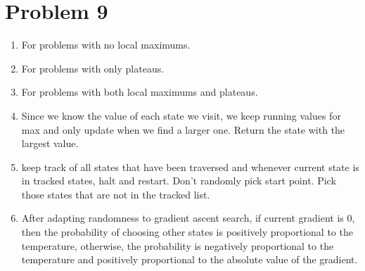 \documentclass{article}
\begin{document}
\section*{Problem 9}
\begin{enumerate}[label=(\alph*)]
    \item For problems with no local maximums.
    \item For problems with only plateaus.
    \item For problems with both local maximums and plateaus.
    \item Since we know the value of each state we visit, we keep running values for max and only update when we find a larger one. Return the state with the largest value.
    \item keep track of all states that have been traversed and whenever current state is in tracked states, halt and restart. Don't randomly pick start point. Pick those states that are not in the tracked list.
    \item After adapting randomness to gradient ascent search, if current gradient is 0, then the probability of choosing other states is positively proportional to the temperature, otherwise, the probability is negatively proportional to the temperature and positively proportional to the absolute value of the gradient.
\end{enumerate}
\end{document}
